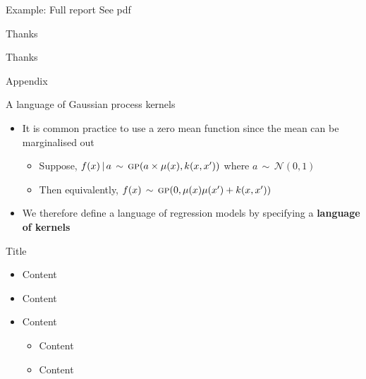 \begin{frame}{Example: Full report}
  See pdf
\end{frame}

\begin{frame}{Thanks}
  \begin{center}
  \Huge
  Thanks
  \end{center}
\end{frame}

\begin{frame}{Appendix}
\end{frame}

\begin{frame}{A language of Gaussian process kernels}
  \begin{itemize}
    \item It is common practice to use a zero mean function since the mean can be marginalised out
  \begin{itemize}
    \item Suppose, ${f(x) \,|\, a \,\sim\, {\textsc{gp}}{}(a \times \mu(x), k(x,x'))}$ where $a \,\sim\, \mathcal{N}(0,1)$
    \item Then equivalently, $f(x) \,\sim\, {\textsc{gp}}{}(0, \mu(x)\mu(x') + k(x,x'))$
  \end{itemize}
  \vspace{\baselineskip}
  \item We therefore define a language of \gp{} regression models by
specifying a {\bf language of kernels}
  \end{itemize}
\end{frame}



\begin{frame}{Title}
  \begin{itemize}
    \item Content
    \vspace{\baselineskip}
    \item Content
    \vspace{\baselineskip}
    \item Content
    \begin{itemize}
       \item Content
       \item Content
     \end{itemize}
  \end{itemize}
\end{frame}
